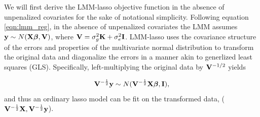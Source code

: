 We will first derive the LMM-lasso objective function in the absence of unpenalized covariates for the sake of notational simplicity. Following equation \eqref{eqn:lmm_reg}, in the absence of unpenalized covariates the LMM assumes $\mathbf{y} \sim N(\mathbf{X} \boldsymbol{\beta}{}, \mathbf{V})$, where $\mathbf{V} = \sigma^2_g \textbf{K} + \sigma^2_e \textbf{I}$. LMM-lasso uses the covariance structure of the errors and properties of the multivariate normal distribution to transform the original data and diagonalize the errors in a manner akin to generlized least squares (GLS). Specifically, left-multiplying the original data by $\mathbf{V}^{-1/2}$ yields 

\begin{equation}
\label{eqn:rtY_distn}
\mathbf{V}^{-\frac{1}{2}}\mathbf{y} \sim N(\mathbf{V}^{-\frac{1}{2}} \mathbf{X} \boldsymbol{\beta}{}, \mathbf{I}),
\end{equation}
and thus an ordinary lasso model can be fit on the transformed data, ($\mathbf{V}^{-\frac{1}{2}}\mathbf{X}, \mathbf{V}^{-\frac{1}{2}}\mathbf{y}$). 

